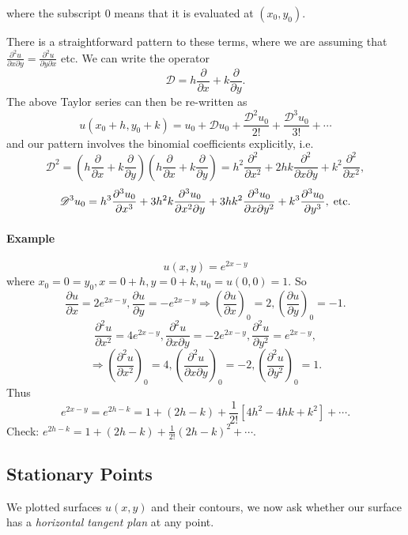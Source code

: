 \documentclass[12pt]{report}
\theoremstyle{definition}
\begin{document}
where the subscript $0$ means that it is evaluated at $(x_0, y_0)$.

\medskip
\noindent There is a straightforward pattern to these terms, where we are assuming
that $\frac{\partial^{2}u}{\partial x \partial y} = \frac{\partial^{2}u}{\partial y \partial x} $ etc.
We can write the operator \[
\mathscr{D} = h\frac{\partial}{\partial x} + k\frac{\partial}{\partial y}.
\] 
The above Taylor series can then be re-written as\[
    u(x_0 + h, y_0 + k) = u_0 + \mathscr{D}u_0 + \frac{\mathscr{D}^{2}u_0}{2!} + \frac{\mathscr{D}^{3}u_0}{3!} + \cdots
\]and our pattern involves the binomial coefficients explicitly, i.e.\ \[
\mathscr{D}^{2} =
\left(h\frac{\partial}{\partial x} + k\frac{\partial}{\partial y} \right)
\left(h\frac{\partial}{\partial x} + k\frac{\partial}{\partial y} \right) =
h^{2}\frac{\partial^{2}}{\partial x^{2}} +
2hk\frac{\partial^{2}}{\partial x\partial y} +
k^{2}\frac{\partial^{2}}{\partial x^{2}},
\]\[
    \mathscr{D}^{3}u_0 = h^{3}\frac{\partial^{3}u_0}{\partial x^{3}}
    + 3h^{2}k\frac{\partial^{3}u_0}{\partial x^{2} \partial y}
    + 3hk^{2}\frac{\partial^{3}u_0}{\partial x \partial y^{2}} 
    + k^{3}\frac{\partial^{3}u_0}{\partial y^{3}},\;\textnormal{etc.}
\]

\paragraph{Example}
\[
    u(x,y) = e^{2x-y}
\]
where $x_0 = 0 = y_0, x = 0 + h, y = 0 + k, u_0 = u(0,0) = 1$.
So\[
    \frac{\partial u}{\partial x} = 2e^{2x-y},
    \frac{\partial u}{\partial y} = -e^{2x-y}
    \Rightarrow{}{\left(\frac{\partial u}{\partial x} \right)}_0 = 2,
    {\left(\frac{\partial u}{\partial y} \right)}_0 = -1.
\]\[
    \frac{\partial^{2}u}{\partial x^{2}} = 4e^{2x-y},
    \frac{\partial^{2}u}{\partial x \partial y} = -2e^{2x-y},
    \frac{\partial^{2}u}{\partial y^{2}} = e^{2x-y},
\]\[
\Rightarrow{}{\left(\frac{\partial^{2}u}{\partial x^{2}} \right)}_{0} = 4,
{\left(\frac{\partial^{2}u}{\partial x \partial y} \right)}_{0} = -2,
{\left(\frac{\partial^{2}u}{\partial y^{2}} \right)}_{0} = 1.
\]
Thus \[
    e^{2x-y} = e^{2h-k} = 1 + (2h-k) + \frac{1}{2!}[4h^{2}-4hk+k^{2}] + \cdots.
\]
Check: $e^{2h-k} = 1 + (2h-k) + \frac{1}{2!}{(2h-k)}^{2} + \cdots$.

\subsection{Stationary Points}

We plotted surfaces $u(x,y)$ and their contours, we now ask whether our surface has
a \emph{horizontal tangent plan} at any point.
\end{document}
